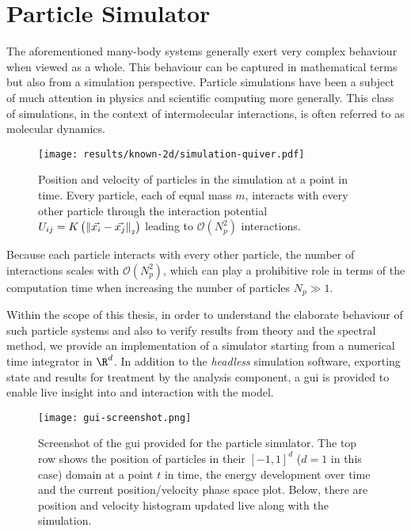 \chapter{Particle Simulator}
\label{chap:particle-simulator}

The aforementioned many-body systems generally exert very complex behaviour when viewed as a whole.
This behaviour can be captured in mathematical terms but also from a simulation perspective.
Particle simulations have been a subject of much attention in physics and scientific computing more generally.
This class of simulations, in the context of intermolecular interactions, is often referred to as molecular dynamics.

\begin{figure}[H]
  \centering
  \label{fig:simulation-quiver}
  \texttt{[image: results/known-2d/simulation-quiver.pdf]}
  \caption[Quiver plot of 120 particles in 2D interacting through the attractive-repulsive potential]{Position and velocity of particles in the simulation at a point in time. Every particle, each of equal mass $m$, interacts with every other particle through the interaction potential $U_{ij} = K\left(\left\lVert\vec{x_i} - \vec{x_j}\right\rVert_{\scriptscriptstyle 2}\right)$ leading to $\mathcal{O}(N_p^2)$ interactions.}
\end{figure}

Because each particle interacts with every other particle, the number of interactions scales with $\mathcal{O}(N_p^2)$,
which can play a prohibitive role in terms of the computation time when increasing the number of particles $N_p \gg 1$.

Within the scope of this thesis, in order to understand the elaborate behaviour of such particle systems and also to verify results from theory and the spectral method, we provide an implementation of a simulator starting from a numerical time integrator in $\R^d$.
In addition to the \textit{headless} simulation software, exporting state and results for treatment by the analysis component, a \gls{gui} is provided to enable live insight into and interaction with the model.

\begin{figure}[H]
  \centering
  \label{fig:gui-screenshot}
  \texttt{[image: gui-screenshot.png]}
  \caption[Graphical User Interface of the Simulator]{Screenshot of the \gls{gui} provided for the particle simulator. The top row shows the position of particles in their $[-1, 1]^d$ ($d = 1$ in this case) domain at a point $t$ in time, the energy development over time and the current position/velocity phase space plot. Below, there are position and velocity histogram updated live along with the simulation.}
\end{figure}

